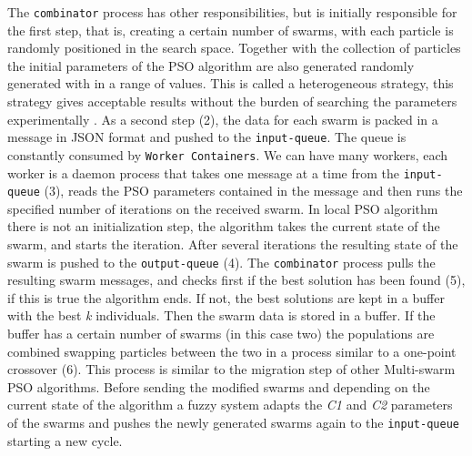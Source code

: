 \documentclass{cys}
\begin{document}
The \texttt{combinator} process has other responsibilities, but is initially responsible 
for  
the first step, that is, creating a certain number of swarms, with each particle 
is randomly positioned in the search space. Together with the collection of particles the 
initial parameters of the PSO algorithm are also generated randomly generated
with in a range of values. This is called a heterogeneous strategy, %
this strategy 
gives acceptable results without the burden of searching the 
parameters experimentally \cite{mancilla2023optimization}. As a second step (2), the data 
for each swarm is packed in a message in JSON format and pushed to the
\texttt{input-queue}. %
The queue is constantly consumed by \texttt{Worker Containers}. 
We can have many workers, each worker is a daemon process that takes one message at a 
time from the \texttt{input-queue} (3), reads the PSO parameters contained in the 
message and then runs the specified number of iterations on the received swarm. In 
local PSO algorithm there is not an initialization step, the algorithm takes the 
current state of the swarm, and starts the iteration. After several iterations the 
resulting state of the swarm is pushed to the \texttt{output-queue} (4). The \texttt{combinator} process pulls the resulting swarm 
messages, and checks first if the best solution has been found (5), if this is true the algorithm ends.  
If not, the best solutions are kept in a buffer with the best \emph{k} individuals. 
Then the swarm data is stored in a buffer. If the buffer has a certain number of 
swarms (in this case two) the populations are combined swapping particles between 
the two in a process similar to a one-point crossover (6). This process is similar 
to the migration step of other Multi-swarm PSO algorithms. Before sending the 
modified swarms and depending on the current state of the algorithm a fuzzy 
system adapts the \emph{C1} and \emph{C2} parameters of the swarms and pushes 
the newly generated swarms again to the \texttt{input-queue} starting a new
cycle. %
\end{document}
